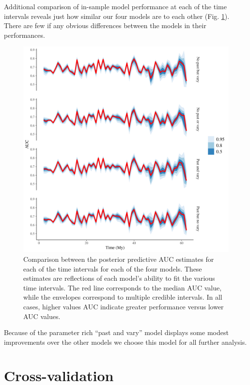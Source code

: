 \documentclass[12pt,letterpaper]{article}
\begin{document}
Additional comparison of in-sample model performance at each of the time intervals reveals just how similar our four models are to each other (Fig. \ref{fig:roc_ts}). There are few if any obvious differences between the models in their performances.
\begin{figure}[ht]
  \centering
  \includegraphics[width=\textwidth,height=0.5\textheight,keepaspectratio=true]{figure/roc_ts}
  \caption{Comparison between the posterior predictive AUC estimates for each of the time intervals for each of the four models. These estimates are reflections of each model's ability to fit the various time intervals. The red line corresponds to the median AUC value, while the envelopes correspond to multiple credible intervals. In all cases, higher values AUC indicate greater performance versus lower AUC values.}
  \label{fig:roc_ts}
\end{figure}

Because of the parameter rich ``past and vary'' model displays some modest improvements over the other models we choose this model for all further analysis.

\section{Cross-validation}
\end{document}
